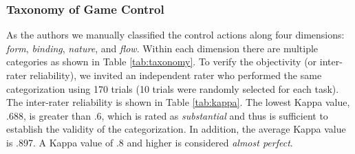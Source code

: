 \documentclass{sigchi}
\begin{document}
  \subsubsection{Taxonomy of Game Control}
       
  As the authors we manually classified the control actions along four dimensions: \emph{form}, \emph{binding}, \emph{nature}, and \emph{flow}. Within each dimension there are multiple categories as shown in Table \ref{tab:taxonomy}. To verify the objectivity (or inter-rater reliability), we invited an independent rater who performed the same categorization using 170 trials (10 trials were randomly selected for each task). The inter-rater reliability is shown in Table \ref{tab:kappa}. The lowest Kappa value, .688, is greater than .6, which is rated as \textsl{substantial} and thus is sufficient to establish the validity of the categorization. In addition, the average Kappa value is .897. A Kappa value of .8 and higher is considered \textsl{almost perfect}\cite{kappavalue}.
\end{document}

